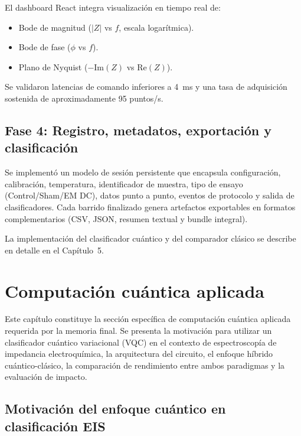 \documentclass[11pt,a4paper,spanish]{book}
\begin{document}
El dashboard React integra visualizaci\'{o}n en tiempo real de:
\begin{itemize}
	\item Bode de magnitud ($|Z|$ vs $f$, escala logar\'{i}tmica).
	\item Bode de fase ($\phi$ vs $f$).
	\item Plano de Nyquist ($-\mathrm{Im}(Z)$ vs $\mathrm{Re}(Z)$).
\end{itemize}

Se validaron latencias de comando inferiores a 4~ms y una tasa de adquisici\'{o}n sostenida de aproximadamente 95 puntos/s.

\section{Fase 4: Registro, metadatos, exportaci\'{o}n y clasificaci\'{o}n}

Se implement\'{o} un modelo de sesi\'{o}n persistente que encapsula configuraci\'{o}n, calibraci\'{o}n, temperatura, identificador de muestra, tipo de ensayo (Control/Sham/EM DC), datos punto a punto, eventos de protocolo y salida de clasificadores. Cada barrido finalizado genera artefactos exportables en formatos complementarios (CSV, JSON, resumen textual y bundle integral).

La implementaci\'{o}n del clasificador cu\'{a}ntico y del comparador cl\'{a}sico se describe en detalle en el Cap\'{i}tulo~5.

\chapter{Computaci\'{o}n cu\'{a}ntica aplicada}

Este cap\'{i}tulo constituye la secci\'{o}n espec\'{i}fica de computaci\'{o}n cu\'{a}ntica aplicada requerida por la memoria final. Se presenta la motivaci\'{o}n para utilizar un clasificador cu\'{a}ntico variacional (VQC) en el contexto de espectroscop\'{i}a de impedancia electroqu\'{i}mica, la arquitectura del circuito, el enfoque h\'{i}brido cu\'{a}ntico-cl\'{a}sico, la comparaci\'{o}n de rendimiento entre ambos paradigmas y la evaluaci\'{o}n de impacto.

\section{Motivaci\'{o}n del enfoque cu\'{a}ntico en clasificaci\'{o}n EIS}
\end{document}
